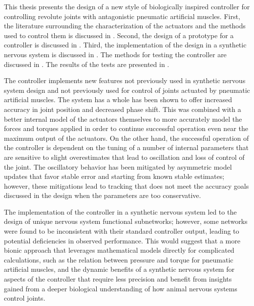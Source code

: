
This thesis presents the design of a new style of biologically inspired
controller for controlling revolute joints with antagonistic pneumatic
artificial muscles. First, the literature surrounding the characterization of
the actuators and the methods used to control them is discussed in
. Second, the
design of a prototype for a controller is discussed in
. Third, the implementation of the design in a
synthetic nervous system is discussed in . The methods
for testing the controller are discussed in . The results of
the tests are presented in .

The controller implements new features not previously used in synthetic nervous
system design and not previously used for control of joints actuated by
pneumatic artificial muscles. The system has a whole has been shown to offer
increased accuracy in joint position and decreased phase shift. This was
combined with a better internal model of the actuators themselves to more
accurately model the forces and torques applied in order to continue successful
operation even near the maximum output of the actuators. On the other hand, the
successful operation of the controller is dependent on the tuning of a number of
internal parameters that are sensitive to slight overestimates that lead to
oscillation and loss of control of the joint. The oscillatory behavior has been mitigated by
asymmetric model updates that favor stable error and starting from known stable
estimates; however, these mitigations lead to tracking that does not meet the accuracy goals
discussed in the design when the parameters are too conservative.

The implementation of the controller in a synthetic nervous system led to the
design of unique nervous system functional subnetworks; however, some networks
were found to be inconsistent with their standard controller output, leading to
potential deficiencies in observed performance. This would suggest that a more
bionic approach that leverages mathematical models directly for complicated
calculations, such as the relation between pressure and torque for pneumatic
artificial muscles, and the dynamic benefits of a synthetic nervous system for
aspects of the controller that require less precision and benefit from insights
gained from a deeper biological understanding of how animal nervous systems
control joints.


